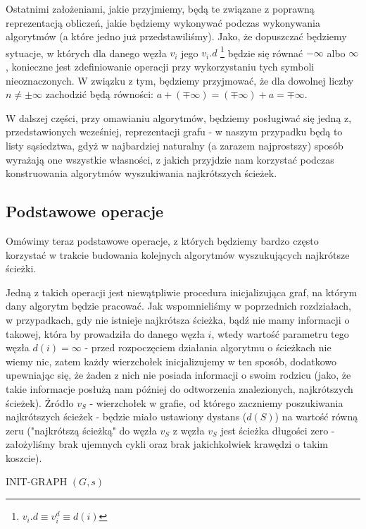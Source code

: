 Ostatnimi założeniami, jakie przyjmiemy, będą te związane z poprawną reprezentacją obliczeń, jakie będziemy wykonywać podczas wykonywania algorytmów (a które jedno już przedstawiliśmy). Jako, że dopuszczać będziemy sytuacje, w których dla danego węzła $v_{i}$ jego $v_{i}.d$ \footnote{$v_{i}.d \equiv v_{i}^{d} \equiv d \left( i\right)$} będzie się równać $- \infty$ albo $\infty$, konieczne jest zdefiniowanie operacji przy wykorzystaniu tych symboli nieoznaczonych. W związku z tym, będziemy przyjmować, że dla dowolnej liczby $n \neq \pm \infty$ zachodzić będą równości: $ a + \left( \mp \infty \right) = \left( \mp \infty \right) + a = \mp \infty$.

W dalszej części, przy omawianiu algorytmów, będziemy posługiwać się jedną z, przedstawionych wcześniej, reprezentacji grafu - w naszym przypadku będą to listy sąsiedztwa, gdyż w najbardziej naturalny (a zarazem najprostszy) sposób wyrażają one wszystkie własności, z jakich przyjdzie nam korzystać podczas konstruowania algorytmów wyszukiwania najkrótszych ścieżek.

\subsection{Podstawowe operacje}

Omówimy teraz podstawowe operacje, z których będziemy bardzo często korzystać w trakcie budowania kolejnych algorytmów wyszukujących najkrótsze ścieżki.

Jedną z takich operacji jest niewątpliwie procedura inicjalizująca graf, na którym dany algorytm będzie pracować. Jak wspomnieliśmy w poprzednich rozdziałach, w przypadkach, gdy nie istnieje najkrótsza ścieżka, bądź nie mamy informacji o takowej, która by prowadziła do danego węzła $i$, wtedy wartość parametru tego węzła $d \left( i \right) = \infty$ - przed rozpoczęciem działania algorytmu o ścieżkach nie wiemy nic, zatem każdy wierzchołek inicjalizujemy w ten sposób, dodatkowo upewniając się, że żaden z nich nie posiada informacji o swoim rodzicu (jako, że takie informacje posłużą nam później do odtworzenia znalezionych, najkrótszych ścieżek). Źródło $v_{S}$ - wierzchołek w grafie, od którego zaczniemy poszukiwania najkrótszych ścieżek - będzie miało ustawiony dystans ($d \left( S \right)$) na wartość równą zeru ("najkrótszą ścieżką" do węzła $v_{S}$ z węzła $v_{S}$ jest ścieżka długości zero - założyliśmy brak ujemnych cykli oraz brak jakichkolwiek krawędzi o takim koszcie).

\begin{algorithm}[!htbp]
\DontPrintSemicolon
{}
\caption{INIT-GRAPH $\left( G, s \right)$\label{alg:init-graph}}
\end{algorithm}

